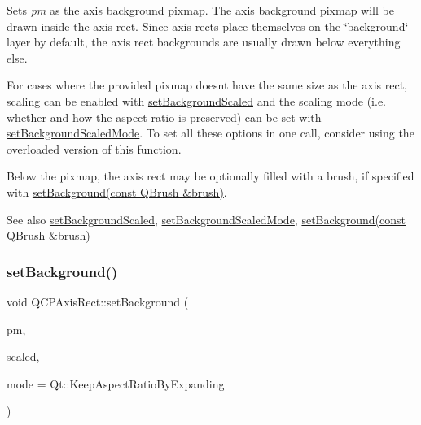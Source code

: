 Sets {\itshape pm} as the axis background pixmap. The axis background pixmap will be drawn inside the axis rect. Since axis rects place themselves on the \char`\"{}background\char`\"{} layer by default, the axis rect backgrounds are usually drawn below everything else.

For cases where the provided pixmap doesn\textquotesingle{}t have the same size as the axis rect, scaling can be enabled with \hyperlink{class_q_c_p_axis_rect_ae6d36c3e0e968ffb991170a018e7b503}{set\+Background\+Scaled} and the scaling mode (i.\+e. whether and how the aspect ratio is preserved) can be set with \hyperlink{class_q_c_p_axis_rect_a5ef77ea829c9de7ba248e473f48f7305}{set\+Background\+Scaled\+Mode}. To set all these options in one call, consider using the overloaded version of this function.

Below the pixmap, the axis rect may be optionally filled with a brush, if specified with \hyperlink{class_q_c_p_axis_rect_a22a22b8668735438dc06f9a55fe46b33}{set\+Background(const Q\+Brush \&brush)}.

\begin{DoxySeeAlso}{See also}
\hyperlink{class_q_c_p_axis_rect_ae6d36c3e0e968ffb991170a018e7b503}{set\+Background\+Scaled}, \hyperlink{class_q_c_p_axis_rect_a5ef77ea829c9de7ba248e473f48f7305}{set\+Background\+Scaled\+Mode}, \hyperlink{class_q_c_p_axis_rect_a22a22b8668735438dc06f9a55fe46b33}{set\+Background(const Q\+Brush \&brush)} 
\end{DoxySeeAlso}
\mbox{\label{class_q_c_p_axis_rect_ac48a2d5d9b7732e73b86605c69c5e4c1}} 
\subsubsection{\texorpdfstring{set\+Background()}{setBackground()}\hspace{0.1cm}{\footnotesize\ttfamily [2/3]}}
{\footnotesize\ttfamily void Q\+C\+P\+Axis\+Rect\+::set\+Background (\begin{DoxyParamCaption}\item[{const Q\+Pixmap \&}]{pm,  }\item[{bool}]{scaled,  }\item[{Qt\+::\+Aspect\+Ratio\+Mode}]{mode = {\ttfamily Qt\+:\+:KeepAspectRatioByExpanding} }\end{DoxyParamCaption})}


